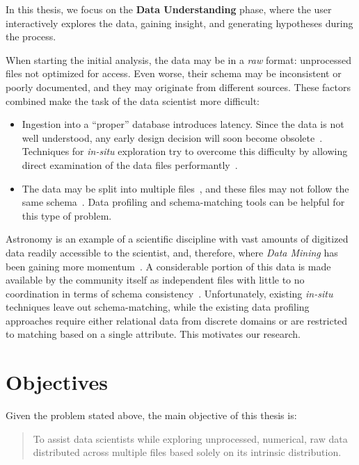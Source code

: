 In this thesis, we focus on the \textbf{Data Understanding} phase, where the user interactively
explores the data, gaining insight, and generating hypotheses during the process.

When starting the initial analysis, the data may be in a \emph{raw} format: unprocessed files not 
optimized for access. Even worse, their schema may be inconsistent or poorly documented, and they may
originate from different sources. These factors combined make the task of the data scientist more
difficult:

\begin{itemize}
    \item Ingestion into a ``proper'' database introduces latency. Since the data is not well
        understood, any early design decision will soon become obsolete~\cite{Kersten2011}.
        Techniques for \emph{in-situ} exploration try to overcome this difficulty
        by allowing direct examination of the data files performantly~\cite{Idreos2011}.
    \item The data may be split into multiple files~\cite{Baud2012}, and these files may not
        follow the same schema~\cite{Alawini2014}. Data profiling and schema-matching tools
        can be helpful for this type of problem.
\end{itemize}

Astronomy is an example of a scientific discipline with vast amounts of digitized data
readily accessible to the scientist, and, therefore, where \emph{Data Mining} has been gaining
more momentum~\cite{Ball2010}. A considerable portion of this data is made available by the community
itself as independent files with little to no coordination in terms of schema consistency~\cite{Pepe2014}.
Unfortunately, existing \emph{in-situ} techniques leave out schema-matching, while the existing
data profiling approaches require either relational data from discrete domains or are restricted to matching based on a single attribute. This motivates our
research.

\section{Objectives}
\label{sec:main_objective}

Given the problem stated above, the main objective of this
thesis is:

\begin{quote}
    To assist data scientists while exploring 
    unprocessed, numerical, raw data distributed across
    multiple files based solely on its intrinsic distribution.
\end{quote}

